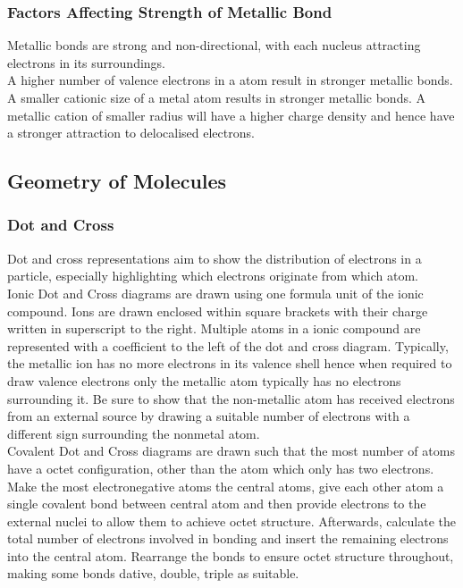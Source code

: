\documentclass[../main]{subfiles}
\begin{document}
	\subsubsection{Factors Affecting Strength of Metallic Bond}

	Metallic bonds are strong and non-directional, with each nucleus attracting electrons in its surroundings. \\

	A higher number of valence electrons in a atom result in stronger metallic bonds.\\

	A smaller cationic size of a metal atom results in stronger metallic bonds. A metallic cation of smaller radius will have a higher charge density and hence have a stronger attraction to delocalised electrons.\\

	\subsection{Geometry of Molecules}

	\subsubsection{Dot and Cross}

	Dot and cross representations aim to show the distribution of electrons in a particle, especially highlighting which electrons originate from which atom. \\

	Ionic Dot and Cross diagrams are drawn using one formula unit of the ionic compound. Ions are drawn enclosed within square brackets with their charge written in superscript to the right. Multiple atoms in a ionic compound are represented with a coefficient to the left of the dot and cross diagram. Typically, the metallic ion has no more electrons in its valence shell hence when required to draw valence electrons only the metallic atom typically has no electrons surrounding it. Be sure to show that the non-metallic atom has received electrons from an external source by drawing a suitable number of electrons with a different sign surrounding the nonmetal atom. \\

	Covalent Dot and Cross diagrams are drawn such that the most number of atoms have a octet configuration, other than the  atom which only has two electrons. Make the most electronegative atoms the central atoms, give each other atom a single covalent bond between central atom and then provide electrons to the external nuclei to allow them to achieve octet structure. Afterwards, calculate the total number of electrons involved in bonding and insert the remaining electrons into the central atom. Rearrange the bonds to ensure octet structure throughout, making some bonds dative, double, triple as suitable.\\
\end{document}
